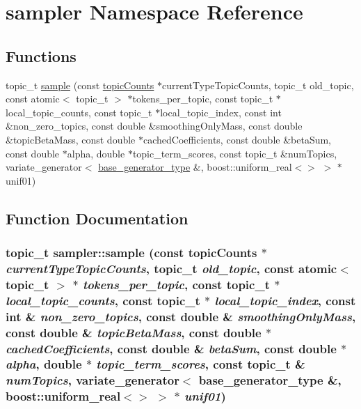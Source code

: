 \hypertarget{namespacesampler}{
\section{sampler Namespace Reference}
\label{namespacesampler}
}
\subsection*{Functions}
\begin{DoxyCompactItemize}
\item 
topic\_\-t \hyperlink{namespacesampler_a5e94e46fa64275d6575d568932f827be}{sample} (const \hyperlink{struct_topic_counts}{topicCounts} $\ast$currentTypeTopicCounts, topic\_\-t old\_\-topic, const atomic$<$ topic\_\-t $>$ $\ast$tokens\_\-per\_\-topic, const topic\_\-t $\ast$local\_\-topic\_\-counts, const topic\_\-t $\ast$local\_\-topic\_\-index, const int \&non\_\-zero\_\-topics, const double \&smoothingOnlyMass, const double \&topicBetaMass, const double $\ast$cachedCoefficients, const double \&betaSum, const double $\ast$alpha, double $\ast$topic\_\-term\_\-scores, const topic\_\-t \&numTopics, variate\_\-generator$<$ \hyperlink{types_8h_a17e4235145adf580fbfd1b811467e3b9}{base\_\-generator\_\-type} \&, boost::uniform\_\-real$<$$>$ $>$ $\ast$unif01)
\end{DoxyCompactItemize}


\subsection{Function Documentation}
\hypertarget{namespacesampler_a5e94e46fa64275d6575d568932f827be}{
\subsubsection[{sample}]{\setlength{\rightskip}{0pt plus 5cm}topic\_\-t sampler::sample (const {\bf topicCounts} $\ast$ {\em currentTypeTopicCounts}, \/  topic\_\-t {\em old\_\-topic}, \/  const atomic$<$ topic\_\-t $>$ $\ast$ {\em tokens\_\-per\_\-topic}, \/  const topic\_\-t $\ast$ {\em local\_\-topic\_\-counts}, \/  const topic\_\-t $\ast$ {\em local\_\-topic\_\-index}, \/  const int \& {\em non\_\-zero\_\-topics}, \/  const double \& {\em smoothingOnlyMass}, \/  const double \& {\em topicBetaMass}, \/  const double $\ast$ {\em cachedCoefficients}, \/  const double \& {\em betaSum}, \/  const double $\ast$ {\em alpha}, \/  double $\ast$ {\em topic\_\-term\_\-scores}, \/  const topic\_\-t \& {\em numTopics}, \/  variate\_\-generator$<$ {\bf base\_\-generator\_\-type} \&, boost::uniform\_\-real$<$$>$ $>$ $\ast$ {\em unif01})}}
\label{namespacesampler_a5e94e46fa64275d6575d568932f827be}
